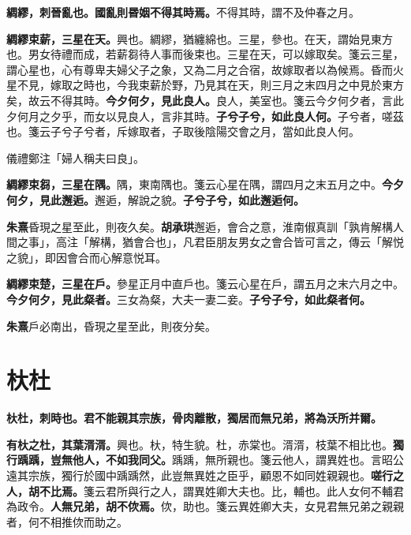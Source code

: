 
\textbf{綢繆，刺晉亂也。國亂則昬姻不得其時焉。}{\footnotesize 不得其時，謂不及仲春之月。}

\textbf{綢繆束薪，三星在天。}{\footnotesize 興也。綢繆，猶纏綿也。三星，參也。在天，謂始見東方也。男女待禮而成，若薪芻待人事而後束也。三星在天，可以嫁取矣。箋云三星，謂心星也，心有尊卑夫婦父子之象，又為二月之合宿，故嫁取者以為候焉。昏而火星不見，嫁取之時也，今我束薪於野，乃見其在天，則三月之末四月之中見於東方矣，故云不得其時。}\textbf{今夕何夕，見此良人。}{\footnotesize 良人，美室也。箋云今夕何夕者，言此夕何月之夕乎，而女以見良人，言非其時。}\textbf{子兮子兮，如此良人何。}{\footnotesize 子兮者，嗟茲也。箋云子兮子兮者，斥嫁取者，子取後陰陽交會之月，當如此良人何。}

\begin{quoting}儀禮鄭注「婦人稱夫曰良」。\end{quoting}

\textbf{綢繆束芻，三星在隅。}{\footnotesize 隅，東南隅也。箋云心星在隅，謂四月之末五月之中。}\textbf{今夕何夕，見此邂逅。}{\footnotesize 邂逅，解說之貌。}\textbf{子兮子兮，如此邂逅何。}

\begin{quoting}\textbf{朱熹}昏現之星至此，則夜久矣。\textbf{胡承珙}邂逅，會合之意，淮南俶真訓「孰肯解構人間之事」，高注「解構，猶會合也」，凡君臣朋友男女之會合皆可言之，傳云「解悦之貌」，即因會合而心解意悦耳。\end{quoting}

\textbf{綢繆束楚，三星在戶。}{\footnotesize 參星正月中直戶也。箋云心星在戶，謂五月之末六月之中。}\textbf{今夕何夕，見此粲者。}{\footnotesize 三女為粲，大夫一妻二妾。}\textbf{子兮子兮，如此粲者何。}

\begin{quoting}\textbf{朱熹}戶必南出，昏現之星至此，則夜分矣。\end{quoting}

\section{杕杜}


\textbf{杕杜，刺時也。君不能親其宗族，骨肉離散，獨居而無兄弟，將為沃所并爾。}

\textbf{有杕之杜，其葉湑湑。}{\footnotesize 興也。杕，特生貌。杜，赤棠也。湑湑，枝葉不相比也。}\textbf{獨行踽踽，豈無他人，不如我同父。}{\footnotesize 踽踽，無所親也。箋云他人，謂異姓也。言昭公遠其宗族，獨行於國中踽踽然，此豈無異姓之臣乎，顧恩不如同姓親親也。}\textbf{嗟行之人，胡不比焉。}{\footnotesize 箋云君所與行之人，謂異姓卿大夫也。比，輔也。此人女何不輔君為政令。}\textbf{人無兄弟，胡不佽焉。}{\footnotesize 佽，助也。箋云異姓卿大夫，女見君無兄弟之親親者，何不相推佽而助之。}


